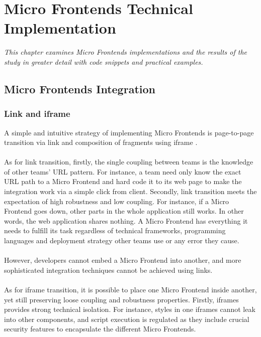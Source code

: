 \documentclass[a4paper]{book}
\begin{document}
\chapter{Micro Frontends Technical Implementation} \label{Micro Frontends Implementations}
\textit{This chapter examines Micro Frontends implementations and the results of the study in greater detail with code snippets and practical examples.}
\section{Micro Frontends Integration} 
\subsection{Link and iframe}
A simple and intuitive strategy of implementing Micro Frontends is page-to-page transition via link and composition of fragments using iframe \cite{iframe}.
\\ \\
As for link transition, firstly, the single coupling between teams is the knowledge of other teams’ URL pattern. For instance, a team need only know the exact URL path to a Micro Frontend and hard code it to its web page to make the integration work via a simple click from client. Secondly, link transition meets the expectation of high robustness and low coupling. For instance, if a Micro Frontend goes down, other parts in the whole application still works. In other words, the web application shares nothing. A Micro Frontend has everything it needs to fulfill its task regardless of technical frameworks, programming languages and deployment strategy other teams use or any error they cause.
\\ \\
However, developers cannot embed a Micro Frontend into another, and more sophisticated integration techniques cannot be achieved using links. 
\\ \\
As for iframe transition, it is possible to place one Micro Frontend inside another, yet still preserving loose coupling and robustness properties. Firstly, iframes provides strong technical isolation. For instance, styles in one iframes cannot leak into other components, and script execution is regulated as they include crucial security features to encapsulate the different Micro Frontends.
\\ \\
\end{document}
